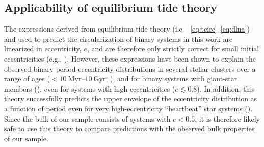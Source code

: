 \documentclass[modern, letterpaper]{aastex62}
\begin{document}
\subsection{Applicability of equilibrium tide theory}
\label{sec:eqtide}


The expressions derived from equilibrium tide theory (i.e. \eqname~\ref{eq:tcirc}--\ref{eq:dlna}) and used to predict the circularization of binary systems in this work are linearized in eccentricity, $e$, and are therefore only strictly correct for small initial eccentricities (e.g., \citealt{Zahn:1989, Mazeh:2007hp}).
However, these expressions have been shown to explain the observed binary period-eccentricity distributions in several stellar clusters over a range of ages ($<10~\textrm{Myr}$--$10~\textrm{Gyr}$; \citealt{Meibom:2005}), and for binary systems with giant-star members (\citealt{Verbunt:1995}), even for systems with high eccentricities ($e \lesssim 0.8$).
In addition, this theory successfully predicts the upper envelope of the eccentricity distribution as a function of period even for very high-eccentricity ``heartbeat'' star systems (\citealt{Shporer:2016}).
Since the bulk of our sample consists of systems with $e < 0.5$, it is therefore likely safe to use this theory to compare predictions with the observed bulk properties of our sample.
\end{document}
